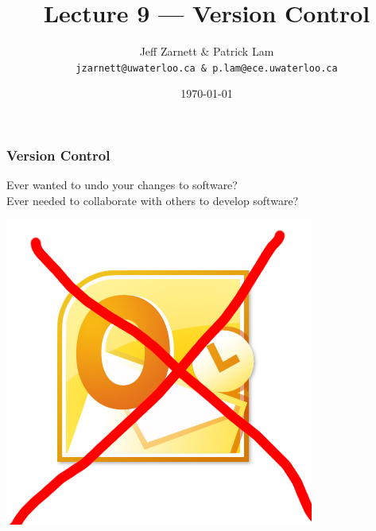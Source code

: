 

\title{Lecture 9 --- Version Control}

\author{Jeff Zarnett \& Patrick Lam \\ \small \texttt{jzarnett@uwaterloo.ca \& p.lam@ece.uwaterloo.ca}}
\date{\today}



\begin{frame}
  \titlepage

\end{frame}

\begin{frame}
\frametitle{Version Control}

\begin{changemargin}{1cm}
\Large
Ever wanted to undo your changes to software? \\[1em]
Ever needed to collaborate with others to develop software?
\begin{center}
\includegraphics[width=.4\textwidth]{images/no-outlook}
\end{center}
\end{changemargin}

\end{frame}

